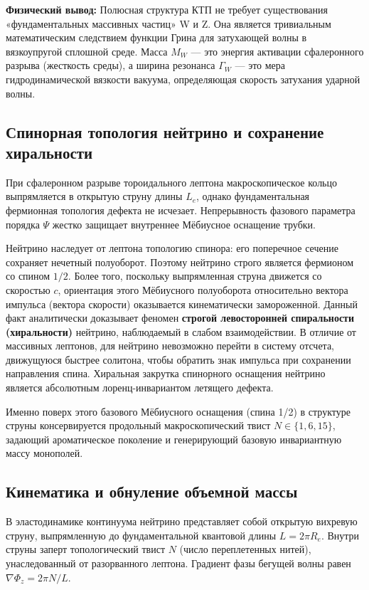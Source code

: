 \documentclass[11pt,a4paper]{article}
\begin{document}
	\textbf{Физический вывод:} Полюсная структура КТП не требует существования «фундаментальных массивных частиц» W и Z. Она является тривиальным математическим следствием функции Грина для затухающей волны в вязкоупругой сплошной среде. Масса $M_W$ — это энергия активации сфалеронного разрыва (жесткость среды), а ширина резонанса $\Gamma_W$ — это мера гидродинамической вязкости вакуума, определяющая скорость затухания ударной волны. 

\subsection{Спинорная топология нейтрино и сохранение хиральности}
При сфалеронном разрыве тороидального лептона макроскопическое кольцо выпрямляется в открытую струну длины $L_e$, однако фундаментальная фермионная топология дефекта не исчезает. Непрерывность фазового параметра порядка $\Psi$ жестко защищает внутреннее Мёбиусное оснащение трубки. 

Нейтрино наследует от лептона топологию спинора: его поперечное сечение сохраняет нечетный полуоборот. Поэтому нейтрино строго является фермионом со спином $1/2$. Более того, поскольку выпрямленная струна движется со скоростью $c$, ориентация этого Мёбиусного полуоборота относительно вектора импульса (вектора скорости) оказывается кинематически замороженной. 
Данный факт аналитически доказывает феномен \textbf{строгой левосторонней спиральности (хиральности)} нейтрино, наблюдаемый в слабом взаимодействии. В отличие от массивных лептонов, для нейтрино невозможно перейти в систему отсчета, движущуюся быстрее солитона, чтобы обратить знак импульса при сохранении направления спина. Хиральная закрутка спинорного оснащения нейтрино является абсолютным лоренц-инвариантом летящего дефекта.

Именно поверх этого базового Мёбиусного оснащения (спина 1/2) в структуре струны консервируется продольный макроскопический твист $N \in \{1, 6, 15\}$, задающий ароматическое поколение и генерирующий базовую инвариантную массу монополей.	

	\subsection{Кинематика и обнуление объемной массы}
	В эластодинамике континуума нейтрино представляет собой открытую вихревую струну, выпрямленную до фундаментальной квантовой длины $L = 2\pi R_e$. Внутри струны заперт топологический твист $N$ (число переплетенных нитей), унаследованный от разорванного лептона. Градиент фазы бегущей волны равен $\nabla \Phi_z = 2\pi N / L$.
	
\end{document}
